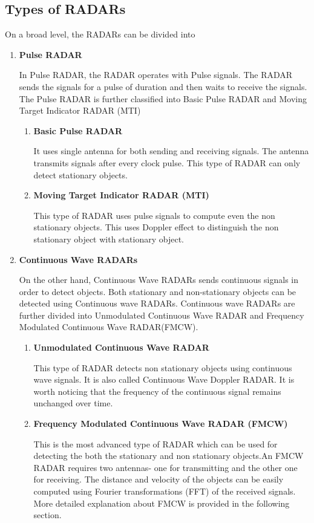 \subsection{Types of RADARs}

On a broad level, the RADARs can be divided into \begin{enumerate}
    \item \textbf{Pulse RADAR}
    
    In Pulse RADAR, the RADAR operates with Pulse signals. The RADAR sends the signals for a pulse of duration and then waits to receive the signals. The Pulse RADAR is further classified into Basic Pulse RADAR and Moving Target Indicator RADAR (MTI)
    \begin{enumerate}
    \item \textbf{Basic Pulse RADAR}
    
    It uses single antenna for both sending and receiving signals.  The antenna transmits signals after every clock pulse. This type of RADAR can only detect stationary objects.
    
    \item \textbf{Moving Target Indicator RADAR (MTI)}
    
    This type of RADAR uses pulse signals to compute even the non stationary objects. This uses Doppler effect to distinguish the non stationary object with stationary object.  
    
\end{enumerate}
    \item \textbf{Continuous Wave RADARs}
    
    On the other hand,  Continuous Wave RADARs sends continuous signals in order to detect objects. Both stationary and non-stationary objects can be detected using Continuous wave RADARs. Continuous wave RADARs are further divided into Unmodulated Continuous Wave RADAR  and Frequency Modulated Continuous Wave RADAR(FMCW).
    \begin{enumerate}

    \item \textbf{Unmodulated Continuous Wave RADAR}
   
    This type of RADAR detects non stationary objects using continuous wave signals. It is also called Continuous Wave Doppler RADAR. It is worth noticing that the frequency of the continuous signal remains unchanged over time.
    
    \item \textbf{Frequency Modulated Continuous Wave RADAR (FMCW)}
    
    This is the most advanced type of RADAR which can be used for detecting the both the stationary and non stationary objects.An FMCW RADAR requires two antennas- one for transmitting and the other one for receiving. The distance and velocity of the objects can be easily computed using Fourier transformations (FFT) of the received signals. More detailed explanation about FMCW is provided in the following section. 
\end{enumerate}
\end{enumerate} 







